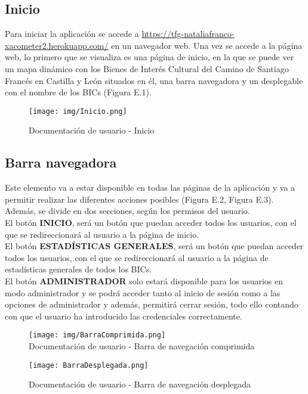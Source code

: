 \subsection{Inicio}
Para iniciar la aplicación se accede a \url{https://tfg-nataliafranco-xacometer2.herokuapp.com/} en un navegador web.
Una vez se accede a la página web, lo primero que se visualiza es una página de inicio, en la que se puede ver un mapa dinámico con los Bienes de Interés Cultural del Camino de Santiago Francés en Castilla y León situados en él, una barra navegadora y un desplegable con el nombre de los BICs (Figura E.1).\\
\begin{figure}[h!]
    \centering
    \texttt{[image: img/Inicio.png]} \\
    \caption{Documentación de usuario - Inicio}
    \label{Documentación de usuario - Inicio}
\end{figure}
\subsection{Barra navegadora}
Este elemento va a estar disponible en todas las páginas de la aplicación y va a permitir realizar las diferentes acciones posibles (Figura E.2, Figura E.3).\\
Además, se divide en dos secciones, según los permisos del usuario.\\
El botón \textbf{INICIO}, será un botón que puedan acceder todos los usuarios, con el que se redireccionará al usuario a la página de inicio.\\
El botón \textbf{ESTADÍSTICAS GENERALES}, será un botón que puedan acceder todos los usuarios, con el que se redireccionará al usuario a la página de estadísticas generales de todos los BICs.\\
El botón \textbf{ADMINISTRADOR} solo estará disponible para los usuarios en modo administrador y se podrá acceder tanto al inicio de sesión como a las opciones de administrador y además, permitirá cerrar sesión, todo ello contando con que el usuario ha introducido las credenciales correctamente.

\begin{figure}[H]
    \begin{minipage}[b]{0.5\linewidth}
        \centering
        \texttt{[image: img/BarraComprimida.png]} \\
        \caption{Documentación de usuario - Barra de navegación comprimida}
        \label{Documentación de usuario - Barra de navegación comprimida}
    \end{minipage}
    \hspace{0.5cm}
    \begin{minipage}[b]{0.5\linewidth}
        \centering
        \texttt{[image: BarraDesplegada.png]}
        \caption{Documentación de usuario - Barra de navegación desplegada}
        \label{Documentación de usuario - Barra de navegación desplegada}
    \end{minipage}
\end{figure}

